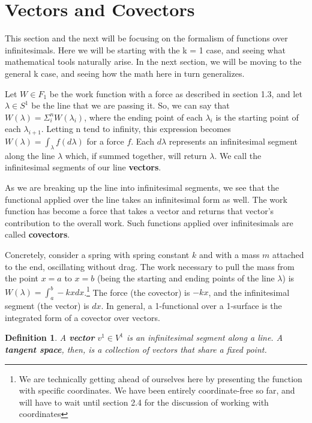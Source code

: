 \documentclass{book}
\newtheorem{defn}[equation]{Definition}
\begin{document}
\section{Vectors and Covectors}


This section and the next will be focusing on the formalism of functions over infinitesimals. Here we will be starting with the k = 1 case, and seeing what mathematical tools naturally arise. In the next section, we will be moving to the general k case, and seeing how the math here in turn generalizes. 


Let $W \in F_1$ be the work function with a force as described in section 1.3, and let $\lambda \in S^1$ be the line that we are passing it. So, we can say that $W(\lambda) = \Sigma^n_iW(\lambda_i)$, where the ending point of each $\lambda_i$ is the starting point of each $\lambda_{i+1}$. Letting n tend to infinity, this expression becomes $W(\lambda) = \int_{\lambda} f(d\lambda)$ for a force $f$. Each $d\lambda$ represents an infinitesimal segment along the line $\lambda$ which, if summed together, will return $\lambda$. We call the infinitesimal segments of our line \textbf{vectors}. 

As we are breaking up the line into infinitesimal segments, we see that the functional applied over the line takes an infinitesimal form as well. The work function has become a force that takes a vector and returns that vector's contribution to the overall work. Such functions applied over infinitesimals are called \textbf{covectors}. 


Concretely, consider a spring with spring constant $k$ and with a mass $m$ attached to the end, oscillating without drag. The work necessary to pull the mass from the point $x = a$ to $x = b$ (being the starting and ending points of the line $\lambda$) is $W(\lambda) = \int_a^b -kx dx$.\footnote{We are technically getting ahead of ourselves here by presenting the function with specific coordinates. We have been entirely coordinate-free so far, and will have to wait until section 2.4 for the discussion of working with coordinates} The force (the covector) is $-kx$, and the infinitesimal segment (the vector) is $dx$. In general, a 1-functional over a 1-surface is the integrated form of a covector over vectors.


\begin{defn}
	A \textbf{vector} $v^1 \in V^1$ is an infinitesimal segment along a line. A \textbf{tangent space}, then, is a collection of vectors that share a fixed point. 
\end{defn}
\end{document}
